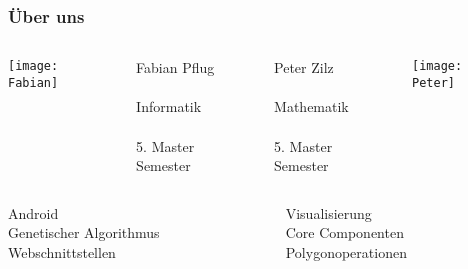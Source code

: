 

\begin{frame}
    \frametitle{Über uns}
	\begin{columns}
		\begin{column}{0.25\textwidth}
			\texttt{[image: Fabian]}
		\end{column}
		\begin{column}{0.25\textwidth}
		\begin{flushleft}
			Fabian Pflug\\
\quad\\
			Informatik\\
\quad\\
			5. Master Semester\\
		\end{flushleft}
		\end{column}
		\begin{column}{0.25\textwidth}
		\begin{flushright}
			Peter Zilz\\
\quad\\
			Mathematik\\
\quad\\
			5. Master Semester\\
		\end{flushright}
		\end{column}
		\begin{column}{0.25\textwidth}
			\texttt{[image: Peter]}
		\end{column}
	\end{columns}
  \begin{columns}
  \begin{column}{0.5\textwidth}
    \begin{flushleft}
        Android\\
        Genetischer Algorithmus\\
        Webschnittstellen\\
    \end{flushleft}
  \end{column}
  \begin{column}{0.5\textwidth}
    \begin{flushright}
        Visualisierung\\
        Core Componenten\\
        Polygonoperationen
    \end{flushright}
  \end{column}
  \end{columns}
\end{frame}

